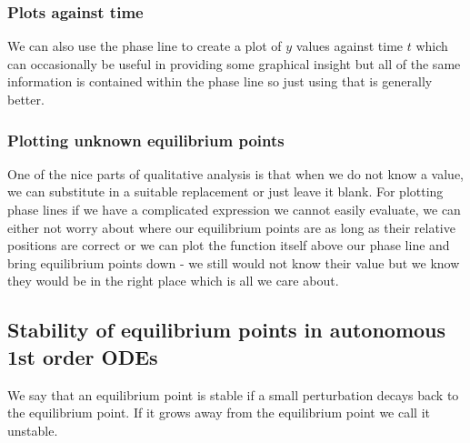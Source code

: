\documentclass[12pt]{article}
\begin{document}
\subsubsection*{Plots against time}
We can also use the phase line to create a plot of \(y\) values against time \(t\) which can occasionally be useful in providing some graphical insight but all of the same information is contained within the phase line so just using that is generally better.
\subsubsection*{Plotting unknown equilibrium points}
One of the nice parts of qualitative analysis is that when we do not know a value, we can substitute in a suitable replacement or just leave it blank. For plotting phase lines if we have a complicated expression we cannot easily evaluate, we can either not worry about where our equilibrium points are as long as their relative positions are correct or we can plot the function itself above our phase line and bring equilibrium points down - we still would not know their value but we know they would be in the right place which is all we care about.
\subsection*{Stability of equilibrium points in autonomous 1st order ODEs}
We say that an equilibrium point is stable if a small perturbation decays back to the equilibrium point. If it grows away from the equilibrium point we call it unstable.
\end{document}
